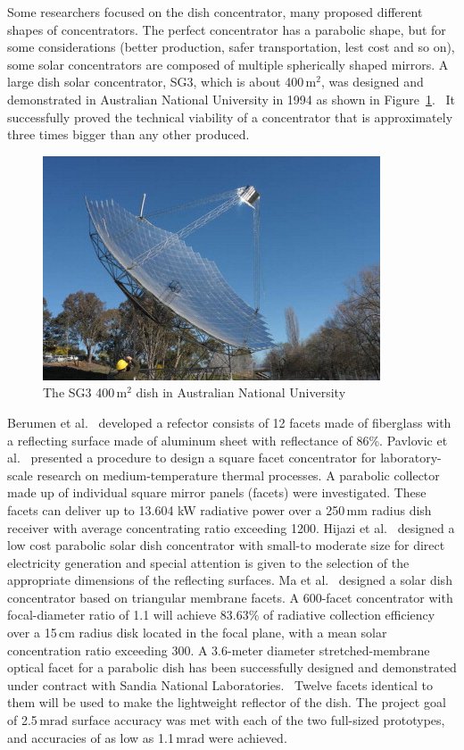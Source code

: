 Some researchers focused on the dish concentrator, many proposed different shapes of concentrators. The perfect concentrator has a parabolic shape, but for some considerations (better production, safer transportation, lest cost and so on), some solar concentrators are composed of multiple spherically shaped mirrors.
A large dish solar concentrator, SG3, which is about 400$\,\mathrm{m^2}$, was designed and demonstrated in Australian National University in 1994 as shown in Figure~\ref{fig:LargeDish}.~\cite{Lovegrove2011} It successfully proved the technical viability of a concentrator that is approximately three times bigger than any other produced. 
\begin{figure}[!ht]
\centering
\includegraphics[width=.8\textwidth]{fig/largeDish.jpg}
\caption{The SG3 400$\,\mathrm{m^2}$ dish in Australian National University}\label{fig:LargeDish}
\end{figure}
Berumen et al.~\cite{Berumen2004} developed a refector consists of 12 facets made of fiberglass with a reflecting surface made of aluminum sheet with reflectance of 86\%.
Pavlovic et al.~\cite{Pavlovic2014} presented a procedure to design a square facet concentrator for laboratory-scale research on medium-temperature thermal processes. A parabolic collector made up of individual square mirror panels (facets) were investigated. These facets can deliver up to 13.604 kW radiative power over a 250$\,\mathrm{mm}$ radius dish receiver with average concentrating ratio exceeding 1200.
Hijazi et al.~\cite{Hijazi2016} designed a low cost parabolic solar dish concentrator with small-to moderate size for direct electricity generation and special attention is given to the selection of the appropriate dimensions of the reflecting surfaces.
Ma et al.~\cite{Ma2012} designed a solar dish concentrator based on triangular membrane facets. A 600-facet concentrator with focal-diameter ratio of 1.1 will achieve 83.63\% of radiative collection efficiency over a 15$\,\mathrm{cm}$ radius disk located in the focal plane, with a mean solar concentration ratio exceeding 300.
A 3.6-meter diameter stretched-membrane optical facet for a parabolic dish has been successfully designed and demonstrated under contract with Sandia National Laboratories.~\cite{Schertz1991} Twelve facets identical to them will be used to make the lightweight reflector of the dish. The project goal of 2.5$\,\mathrm{mrad}$ surface accuracy was met with each of the two full-sized prototypes, and accuracies of as low as 1.1$\,\mathrm{mrad}$ were achieved.

